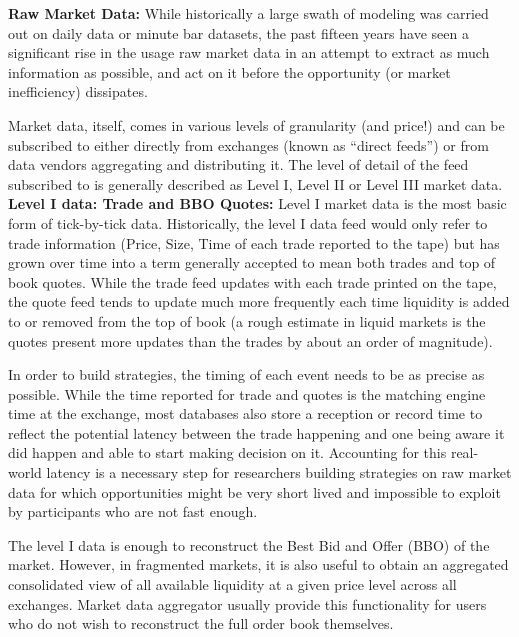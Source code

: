 \noindent\textbf{Raw Market Data:} While historically a large swath of modeling was carried out on daily data or minute bar datasets, the past fifteen years have seen a significant rise in the usage raw market data in an attempt to extract as much information as possible, and act on it before the opportunity (or market inefficiency) dissipates.

Market data, itself, comes in various levels of granularity (and price!) and can be subscribed to either directly from exchanges (known as ``direct feeds'') or from data vendors aggregating and distributing it. The level of detail of the feed subscribed to is generally described as Level I, Level II or Level III market data.\\


\noindent\textbf{Level I data: Trade and BBO Quotes:} Level I market data is the most basic form of tick-by-tick data. Historically, the level I data feed would only refer to trade information (Price, Size, Time of each trade reported to the tape) but has grown over time into a term generally accepted to mean both trades and top of book quotes. While the trade feed updates with each trade printed on the tape, the quote feed tends to update much more frequently each time liquidity is added to or removed from the top of book (a rough estimate in liquid markets is the quotes present more updates than the trades by about an order of magnitude). 


In order to build strategies, the timing of each event needs to be as precise as possible. While the time reported for trade and quotes is the matching engine time at the exchange, most databases also store a reception or record time to reflect the potential latency between the trade happening and one being aware it did happen and able to start making decision on it. Accounting for this real-world latency is a necessary step for researchers building strategies on raw market data for which opportunities might be very short lived and impossible to exploit by participants who are not fast enough.


The level I data is enough to reconstruct the Best Bid and Offer (BBO) of the market. However, in fragmented markets, it is also useful to obtain an aggregated consolidated view of all available liquidity at a given price level across all exchanges. Market data aggregator usually provide this functionality for users who do not wish to reconstruct the full order book themselves. 


